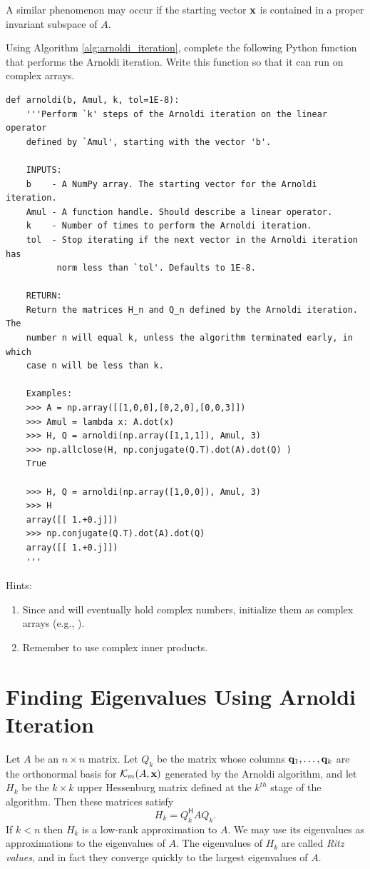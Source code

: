 A similar phenomenon may occur if the starting vector ${\bf x}$ is contained in a proper invariant subspace of $A$.

\begin{problem}\label{prob:arnoldi}
Using Algorithm \ref{alg:arnoldi_iteration}, complete the following Python function that performs the Arnoldi iteration.
Write this function so that it can run on complex arrays.
\begin{lstlisting}
def arnoldi(b, Amul, k, tol=1E-8):
    '''Perform `k' steps of the Arnoldi iteration on the linear operator 
    defined by `Amul', starting with the vector 'b'.
    
    INPUTS:
    b    - A NumPy array. The starting vector for the Arnoldi iteration.
    Amul - A function handle. Should describe a linear operator.
    k    - Number of times to perform the Arnoldi iteration.
    tol  - Stop iterating if the next vector in the Arnoldi iteration has 
          norm less than `tol'. Defaults to 1E-8.
    
    RETURN:
    Return the matrices H_n and Q_n defined by the Arnoldi iteration. The 
    number n will equal k, unless the algorithm terminated early, in which 
    case n will be less than k.
    
    Examples:
    >>> A = np.array([[1,0,0],[0,2,0],[0,0,3]])
    >>> Amul = lambda x: A.dot(x)
    >>> H, Q = arnoldi(np.array([1,1,1]), Amul, 3)
    >>> np.allclose(H, np.conjugate(Q.T).dot(A).dot(Q) )
    True
    
    >>> H, Q = arnoldi(np.array([1,0,0]), Amul, 3)
    >>> H
    array([[ 1.+0.j]])
    >>> np.conjugate(Q.T).dot(A).dot(Q)
    array([[ 1.+0.j]])
    '''
\end{lstlisting}
Hints: 
\begin{enumerate}
\item Since  and  will eventually hold complex numbers, initialize them as complex arrays (e.g., ). 
\item Remember to use complex inner products. 
\end{enumerate}
\end{problem}



\section*{Finding Eigenvalues Using Arnoldi Iteration}
Let $A$ be an $n \times n$ matrix. 
Let $Q_k$ be the matrix whose columns ${\bf q}_1, \ldots, {\bf q}_k$ are the orthonormal basis for $\mathcal{K}_m(A, {\bf x})$ generated by the Arnoldi algorithm, and
let $H_k$ be the $k\times k$ upper Hessenburg matrix defined at the $k^{th}$ stage of the algorithm.
Then these matrices satisfy
\begin{equation}\label{equ:hqa}
H_k = Q_k^{\mathsf H} A Q_k.
\end{equation}
If $k<n$ then $H_k$ is a low-rank approximation to $A$.
We may use its eigenvalues as approximations to the eigenvalues of $A$.
The eigenvalues of $H_k$ are called \emph{Ritz values}, and in fact they converge quickly to the largest eigenvalues of $A$.

